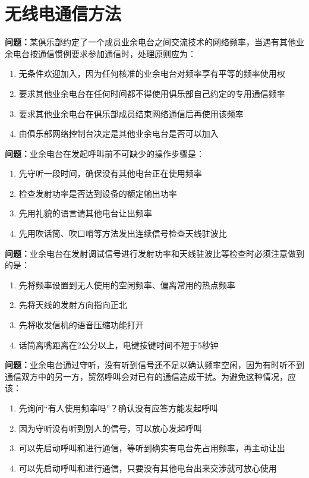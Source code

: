 \chapter{无线电通信方法}

\textbf{问题：}某俱乐部约定了一个成员业余电台之间交流技术的网络频率，当遇有其他业余电台按通信惯例要求参加通信时，处理原则应为：
\begin{enumerate}[label=\Alph*), leftmargin=1cm]
	\item 无条件欢迎加入，因为任何核准的业余电台对频率享有平等的频率使用权
	\item 要求其他业余电台在任何时间都不得使用俱乐部自己约定的专用通信频率
	\item 要求其他业余电台在俱乐部成员结束网络通信后再使用该频率
	\item 由俱乐部网络控制台决定是其他业余电台是否可以加入
\end{enumerate}

\textbf{问题：}业余电台在发起呼叫前不可缺少的操作步骤是：
\begin{enumerate}[label=\Alph*), leftmargin=1cm]
	\item 先守听一段时间，确保没有其他电台正在使用频率
	\item 检查发射功率是否达到设备的额定输出功率
	\item 先用礼貌的语言请其他电台让出频率
	\item 先用吹话筒、吹口哨等方法发出连续信号检查天线驻波比
\end{enumerate}

\textbf{问题：}业余电台在发射调试信号进行发射功率和天线驻波比等检查时必须注意做到的是：
\begin{enumerate}[label=\Alph*), leftmargin=1cm]
	\item 先将频率设置到无人使用的空闲频率、偏离常用的热点频率
	\item 先将天线的发射方向指向正北
	\item 先将收发信机的语音压缩功能打开
	\item 话筒离嘴距离在2公分以上，电键按键时间不短于5秒钟
\end{enumerate}

\textbf{问题：}业余电台通过守听，没有听到信号还不足以确认频率空闲，因为有时听不到通信双方中的另一方，贸然呼叫会对已有的通信造成干扰。为避免这种情况，应该：
\begin{enumerate}[label=\Alph*), leftmargin=1cm]
	\item 先询问“有人使用频率吗”？确认没有应答方能发起呼叫
	\item 因为守听没有听到别人的信号，可以放心发起呼叫
	\item 可以先启动呼叫和进行通信，等听到确实有电台先占用频率，再主动让出
	\item 可以先启动呼叫和进行通信，只要没有其他电台出来交涉就可放心使用
\end{enumerate}

